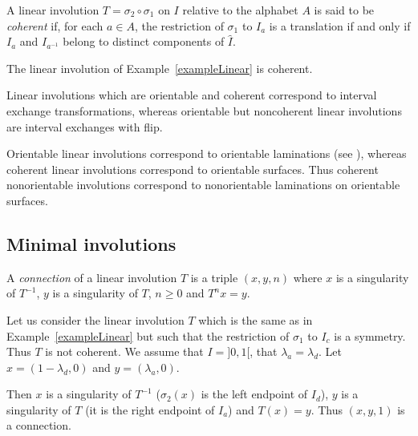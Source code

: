 \documentclass[preprint,12pt]{elsarticle}
\numberwithin{theorem}{section}
\numberwithin{equation}{section}
\numberwithin{figure}{section}
\numberwithin{table}{section}
\begin{document}
A linear involution $T=\sigma_2\circ \sigma_1$ on $I$
relative to the alphabet $A$
is said to be \emph{coherent} if, for each $a\in A$, the restriction
of $\sigma_1$ to $I_a$ is a translation if and only if $I_a$
and $I_{a^{-1}}$ belong to distinct components of $\hat{I}$. 

\begin{example}
The linear involution of Example~\ref{exampleLinear} is coherent.
\end{example}

Linear involutions which are orientable and coherent
correspond to interval exchange transformations, 
whereas  orientable but noncoherent  linear
involutions are interval exchanges with flip.

Orientable linear involutions correspond to orientable laminations (see
\cite{BertheDelecroixDolcePerrinReutenauerRindone2014}), whereas 
 coherent
linear involutions correspond to orientable surfaces. Thus coherent
nonorientable involutions correspond to nonorientable laminations
on orientable surfaces.





\subsection{Minimal involutions}

A \emph{connection} of a linear involution $T$ is a triple $(x,y,n)$ 
where $x$ is a singularity of $T^{-1}$, $y$ is a singularity of $T$,
$n\ge 0$ and $T^n x = y$. 

\begin{example}\label{exampleConnection}
Let us consider the linear involution $T$ which is the same as in Example~\ref{exampleLinear} but such that the restriction of $\sigma_1$ to $I_c$ 
is a symmetry. Thus $T$ is not coherent. We assume that $I=]0,1[$,
that $\lambda_a=\lambda _d$. Let $x=(1-\lambda_d,0)$ and $y=(\lambda_a,0)$.

Then $x$ is a singularity of $T^{-1}$ ($\sigma_2(x)$ is the left endpoint
of $I_d$), $y$ is a singularity of $T$ (it is the right endpoint of $I_a$)
and $T(x)=y$. Thus $(x,y,1)$ is a connection.
\end{example}
\end{document}
